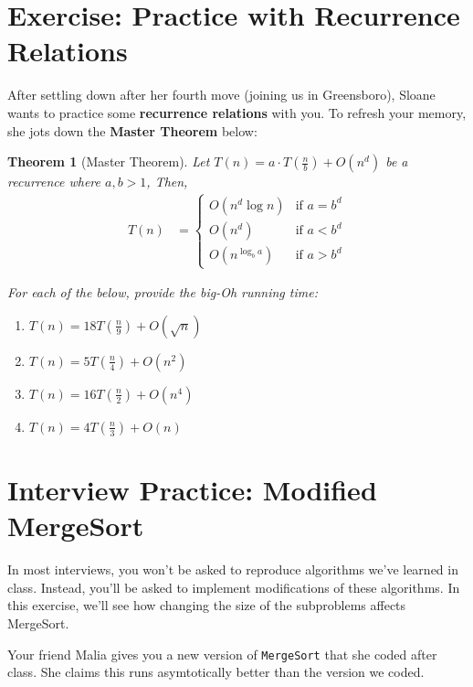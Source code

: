 \documentclass [12pt]{article}
\newtheorem{theorem}{Theorem}
\begin{document}
\pagebreak
\section{Exercise: Practice with Recurrence Relations}
 After settling down after her fourth move (joining us in Greensboro), Sloane wants to practice some \textbf{recurrence relations} with you. To refresh your memory, she jots down the \textbf{Master Theorem} below:

\begin{theorem}[Master Theorem]
Let $T(n) = a \cdot T\left(\frac{n}{b}\right) + O(n^d)$ be a recurrence where $a, b > 1$, Then,
\begin{align*}
T(n) &= \begin{cases}
    O(n^d \log n) & \text{if } a = b^d \\
    O(n^d) & \text{if } a < b^d \\
    O(n^{\log_b a}) & \text{if } a > b^d
\end{cases}
\end{align*}


For each of the below, provide the big-Oh running time:
\begin{enumerate}[label=(\alph*)]
    \item {} $T(n) = 18T\left(\frac{n}{9} \right) + O(\sqrt{n})$
    \item {} $T(n) = 5T\left(\frac{n}{4} \right) + O(n^2)$
    \item {} $T(n) = 16T\left(\frac{n}{2} \right) + O(n^4)$
    \item {} $T(n) = 4T\left(\frac{n}{3} \right) + O(n)$
\end{enumerate}
\end{theorem}



\pagebreak
\section{Interview Practice: Modified MergeSort}
 In most interviews, you won't be asked to reproduce algorithms we've learned in class. Instead, you'll be asked to implement modifications of these algorithms. In this exercise, we'll see how changing the size of the subproblems affects MergeSort.

Your friend Malia gives you a new version of \texttt{MergeSort} that she coded after class. She claims this runs asymtotically better than the version we coded.
\end{document}
